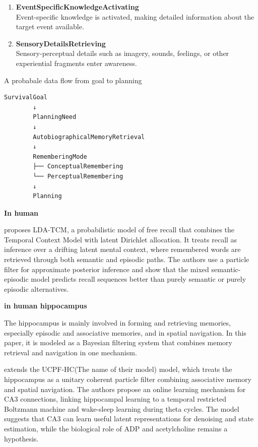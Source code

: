 \documentclass{book}
\providecommand{\ProjectDeepHeading}[2]{%
    \par\medskip\noindent\textbf{#2}\par\smallskip
}
\begin{document}
\begin{enumerate}
        \item \textbf{EventSpecificKnowledgeActivating}\\
        Event-specific knowledge is activated, making detailed information about the target event available.
        
        \item \textbf{SensoryDetailsRetrieving}\\
        Sensory-perceptual details such as imagery, sounds, feelings, or other experiential fragments enter awareness.
    \end{enumerate}
    
    
    A probabale data flow from goal to planning
    
    \begin{verbatim}
SurvivalGoal
        ↓
        PlanningNeed
        ↓
        AutobiographicalMemoryRetrieval
        ↓
        RememberingMode
        ├── ConceptualRemembering
        └── PerceptualRemembering
        ↓
        Planning
    \end{verbatim}


\ProjectDeepHeading{19}{In human}
        \cite{socher-2009-a-bayesian-analysis-of-dynamics-in-free-recall} proposes LDA-TCM, a probabilistic model of free recall that combines the Temporal Context Model with latent Dirichlet allocation. It treats recall as inference over a drifting latent mental context, where remembered words are retrieved through both semantic and episodic paths. The authors use a particle filter for approximate posterior inference and show that the mixed semantic-episodic model predicts recall sequences better than purely semantic or purely episodic alternatives.
        
        \ProjectDeepHeading{20}{in human hippocampus}
            The hippocampus is mainly involved in forming and retrieving memories, especially episodic and associative memories, and in spatial navigation. In this paper, it is modeled as a Bayesian filtering system that combines memory retrieval and navigation in one mechanism.
            
            \cite{fox-2010-learning-in-a-unitary-coherent-hippocampus} extends the UCPF-HC(The name of their model) model, which treats the hippocampus as a unitary coherent particle filter combining associative memory and spatial navigation.
            The authors propose an online learning mechanism for CA3 connections, linking hippocampal learning to a temporal restricted Boltzmann machine and wake-sleep learning during theta cycles.
            The model suggests that CA3 can learn useful latent representations for denoising and state estimation, while the biological role of ADP and acetylcholine remains a hypothesis.
    
\end{document}
